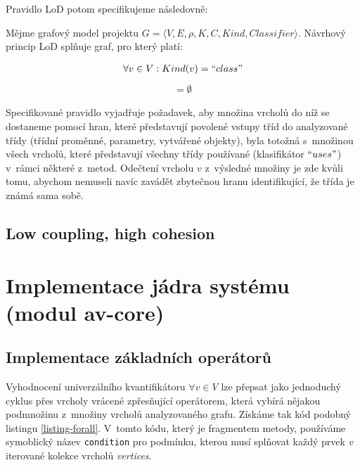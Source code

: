 Pravidlo LoD potom specifikujeme následovně:

\begin{designprinciple}
Mějme grafový model projektu $G = \langle V, E, \rho, K, C, \mathit{Kind}, \mathit{Classifier}\rangle$. Návrhový princip LoD splňuje graf, pro který platí:

\begin{align*}
\forall v \in V: Kind(v) = ``class"\\
\end{align*}
\begin{align*}
[((&F(G, v, ``class", ``has\_field") \cup F(G, v, ``class", ``has\_param") \cup \\
&F(G, v, ``class", ``instantiates")) \cap F(v, ``class", ``uses") \setminus \{v\}] = \emptyset
\end{align*}

\end{designprinciple}

Specifikované pravidlo vyjadřuje požadavek, aby množina vrcholů do níž se dostaneme pomocí hran, které představují povolené vstupy tříd do analyzované třídy (třídní proměnné, parametry, vytvářené objekty), byla totožná s~množinou všech vrcholů, které představují všechny třídy používané (klasifikátor $``uses"$) v~rámci některé z~metod. Odečtení vrcholu $v$ z~výsledné množiny je zde kvůli tomu, abychom nemuseli navíc zavádět zbytečnou hranu identifikující, že třída je známá sama sobě.

\subsection{Low coupling, high cohesion}

\section{Implementace jádra systému (modul av-core)}

\subsection{Implementace základních operátorů}
Vyhodnocení univerzálního kvantifikátoru $\forall v \in V$ lze přepsat jako jednoduchý cyklus přes vrcholy vrácené zpřesňující operátorem, která vybírá nějakou podmnožinu z~množiny vrcholů analyzovaného grafu. Získáme tak kód podobný listingu \ref{listing-forall}. V~tomto kódu, který je fragmentem metody, používáme symoblický název \verb+condition+ pro podmínku, kterou musí splňovat každý prvek \emph{v} iterované kolekce vrcholů \emph{vertices}.

